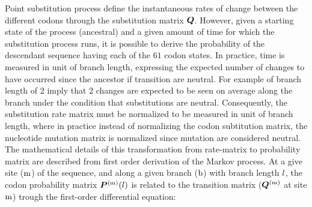 Point \gls{substitution} process define the instantaneous rates of change between the different \glspl{codon} through the \gls{substitution} matrix $\bm{Q}$.
However, given a starting state of the process (ancestral) and a given amount of time for which the \gls{substitution} process runs, it is possible to derive the probability of the descendant sequence having each of the $61$ \gls{codon} states.
In practice, time is measured in unit of branch length, expressing the expected number of changes to have occurred since the ancestor if {transition} are \gls{neutral}.
For example of branch length of $2$ imply that $2$ changes are expected to be seen on average along the branch under the condition that \glspl{substitution} are \gls{neutral}.
Consequently, the \gls{substitution} rate matrix must be normalized to be measured in unit of branch length, where in practice instead of normalizing the \gls{codon} subtitution matrix, the nucleotide mutation matrix is normalized since mutation are considered \gls{neutral}.
The mathematical details of this transformation from rate-matrix to probability matrix are described from first order derivation of the Markov process.
At a give site ($\text{m}$) of the sequence, and along a given branch ($\text{b}$) with branch length $l$, the \gls{codon} probability matrix $\bm{P}^{(\text{m})}(l)$ is related to the {transition} matrix ($\bm{Q}^{(\text{m})}$ at site $\text{m}$) trough the first-order differential equation:

